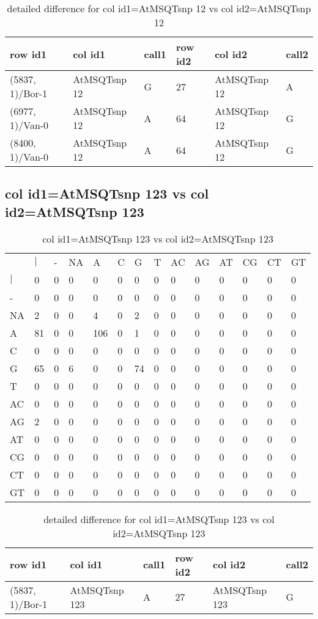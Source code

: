 \begin{center}
\begin{longtable}{|l|l|l|l|l|l|}
\caption{detailed difference for col id1=AtMSQTsnp 12 vs col id2=AtMSQTsnp 12} \label{table_dm705}\\
\hline
row id1&col id1&call1&row id2&col id2&call2\\
\hline
(5837, 1)/Bor-1&AtMSQTsnp 12&G&27&AtMSQTsnp 12&A\\
(6977, 1)/Van-0&AtMSQTsnp 12&A&64&AtMSQTsnp 12&G\\
(8400, 1)/Van-0&AtMSQTsnp 12&A&64&AtMSQTsnp 12&G\\
\hline
\end{longtable}
\end{center}

\subsection{col id1=AtMSQTsnp 123 vs col id2=AtMSQTsnp 123}
\begin{center}
\begin{longtable}{|l|l|l|l|l|l|l|l|l|l|l|l|l|l|}
\caption{col id1=AtMSQTsnp 123 vs col id2=AtMSQTsnp 123} \label{table_dm706}\\
\hline
\\
\hline
&$|$&-&NA&A&C&G&T&AC&AG&AT&CG&CT&GT\\
$|$&0&0&0&0&0&0&0&0&0&0&0&0&0\\
-&0&0&0&0&0&0&0&0&0&0&0&0&0\\
NA&2&0&0&4&0&2&0&0&0&0&0&0&0\\
A&81&0&0&106&0&1&0&0&0&0&0&0&0\\
C&0&0&0&0&0&0&0&0&0&0&0&0&0\\
G&65&0&6&0&0&74&0&0&0&0&0&0&0\\
T&0&0&0&0&0&0&0&0&0&0&0&0&0\\
AC&0&0&0&0&0&0&0&0&0&0&0&0&0\\
AG&2&0&0&0&0&0&0&0&0&0&0&0&0\\
AT&0&0&0&0&0&0&0&0&0&0&0&0&0\\
CG&0&0&0&0&0&0&0&0&0&0&0&0&0\\
CT&0&0&0&0&0&0&0&0&0&0&0&0&0\\
GT&0&0&0&0&0&0&0&0&0&0&0&0&0\\
\hline
\end{longtable}
\end{center}

\begin{center}
\begin{longtable}{|l|l|l|l|l|l|}
\caption{detailed difference for col id1=AtMSQTsnp 123 vs col id2=AtMSQTsnp 123} \label{table_dm707}\\
\hline
row id1&col id1&call1&row id2&col id2&call2\\
\hline
(5837, 1)/Bor-1&AtMSQTsnp 123&A&27&AtMSQTsnp 123&G\\
\hline
\end{longtable}
\end{center}

